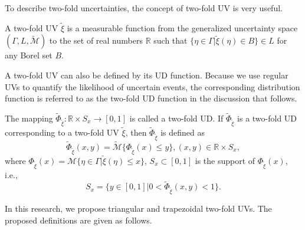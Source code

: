 \par To describe two-fold uncertainties, the concept of two-fold UV is very useful.
\begin{definition}\cite{Yang 2015}\label{def.9}
	A two-fold UV $\tilde{\xi}$ is a measurable function from the generalized uncertainty space $(\Gamma,L,{\mathcal{\tilde{M}}})$ to the set of real numbers $\mathbb{R}$ such that $\{\eta\in \Gamma|\tilde{\xi}(\eta)\in B\}\in L$ for any Borel set $B$.
\end{definition}
\par A two-fold UV can also be defined by its UD function. Because we use regular UVs to quantify the likelihood of uncertain events, the corresponding distribution function is referred to as the two-fold UD function in the discussion that follows.
\begin{definition}\cite{Yang 2015}\label{def.10}
	 The mapping $\tilde{\Phi}_{\tilde{\xi}}:\mathbb{R}\times S_x \to [0,1]$ is called a two-fold UD. If $\tilde{\Phi}_{\tilde{\xi}}$ is a two-fold UD corresponding to a two-fold UV $\tilde{\xi}$, then $\tilde{\Phi}_{\tilde{\xi}}$ is defined as $$\tilde{\Phi}_{\tilde{\xi}}(x,y)=\mathcal{\tilde{M}}\{\Phi_{\tilde{\xi}}(x)\leq y\}, (x,y)\in \mathbb{R}\times S_x,$$
	where $\Phi_{\tilde{\xi}}(x)=\mathcal{M}\{\eta\in \Gamma|\tilde{\xi}(\eta)\leq x\}$, $S_x\subset [0,1]$ is the support of $\Phi_{\tilde{\xi}}(x)$, i.e., $$S_x=\{y\in[0,1]\big|0<\tilde{\Phi}_{\tilde{\xi}}(x,y)<1\}.$$
\end{definition}
\par In this research, we propose triangular and trapezoidal two-fold UVs. The proposed definitions are given as follows.
